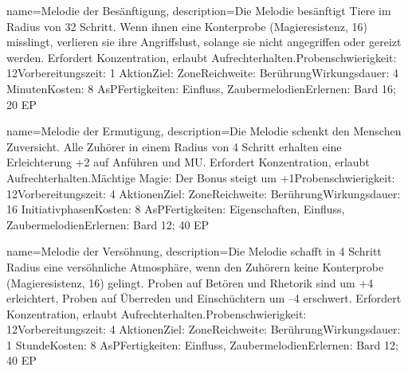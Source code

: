 {
    name={Melodie der Besänftigung},
    description={Die Melodie besänftigt Tiere im Radius von 32 Schritt. Wenn ihnen eine Konterprobe (Magieresistenz, 16) misslingt, verlieren sie ihre Angriffslust, solange sie nicht angegriffen oder gereizt werden. Erfordert Konzentration, erlaubt Aufrechterhalten.\newline Probenschwierigkeit: 12\newline Vorbereitungszeit: 1 Aktion\newline Ziel: Zone\newline Reichweite: Berührung\newline Wirkungsdauer: 4 Minuten\newline Kosten: 8 AsP\newline Fertigkeiten: Einfluss, Zaubermelodien\newline Erlernen: Bard 16; 20 EP}
}


{
    name={Melodie der Ermutigung},
    description={Die Melodie schenkt den Menschen Zuversicht. Alle Zuhörer in einem Radius von 4 Schritt erhalten eine Erleichterung +2 auf Anführen und MU. Erfordert Konzentration, erlaubt Aufrechterhalten.\newline Mächtige Magie: Der Bonus steigt um +1\newline Probenschwierigkeit: 12\newline Vorbereitungszeit: 4 Aktionen\newline Ziel: Zone\newline Reichweite: Berührung\newline Wirkungsdauer: 16 Initiativphasen\newline Kosten: 8 AsP\newline Fertigkeiten: Eigenschaften, Einfluss, Zaubermelodien\newline Erlernen: Bard 12; 40 EP}
}


{
    name={Melodie der Versöhnung},
    description={Die Melodie schafft in 4 Schritt Radius eine versöhnliche Atmosphäre, wenn den Zuhörern keine Konterprobe (Magieresistenz, 16) gelingt. Proben auf Betören und Rhetorik sind um +4 erleichtert, Proben auf Überreden und Einschüchtern um –4 erschwert. Erfordert Konzentration, erlaubt Aufrechterhalten.\newline Probenschwierigkeit: 12\newline Vorbereitungszeit: 4 Aktionen\newline Ziel: Zone\newline Reichweite: Berührung\newline Wirkungsdauer: 1 Stunde\newline Kosten: 8 AsP\newline Fertigkeiten: Einfluss, Zaubermelodien\newline Erlernen: Bard 12; 40 EP}
}


